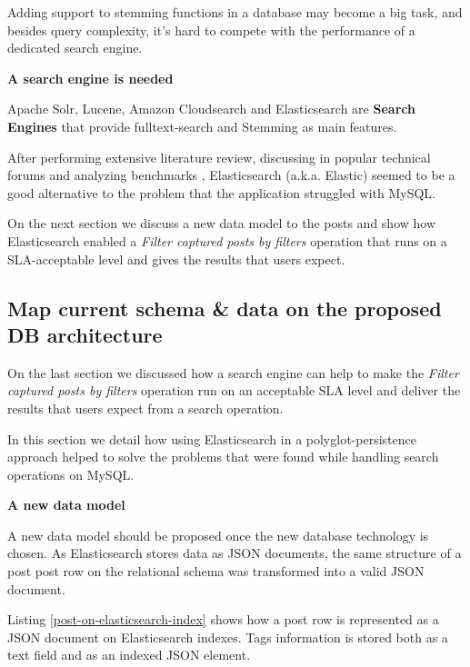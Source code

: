 Adding support to stemming functions in a database may become a big task, and besides query complexity, it's hard to compete with the performance of a dedicated search engine.   

\noindent \textbf{A search engine is needed}

Apache Solr, Lucene, Amazon Cloudsearch and Elasticsearch are \textbf{Search Engines} that provide fulltext-search and Stemming as main features.

After performing extensive literature review, discussing in popular technical forums and analyzing benchmarks \cite{StackOverflowElastic} \cite{SolrVsES} \cite{quoraES}, Elasticsearch (a.k.a. Elastic) seemed to be a good alternative to the problem that the application struggled with MySQL.

On the next section we discuss a new data model to the posts and show how Elasticsearch enabled a \textit{Filter captured posts by filters} operation that runs on a SLA-acceptable level and gives the results that users expect. 

 










\subsection{Map current schema \& data on the proposed DB architecture}

On the last section we discussed how a search engine can help to make the \textit{Filter captured posts by filters} operation run on an acceptable SLA level and deliver the results that users expect from a search operation. 

In this section we detail how using Elasticsearch in a polyglot-persistence approach helped to solve the problems that were found while handling search operations on MySQL.

\noindent \textbf{A new data model}

A new data model should be proposed once the new database technology is chosen. As Elasticsearch stores data as JSON documents, the same structure of a post post row on the relational schema was transformed into a valid JSON document.

Listing \ref{post-on-elasticsearch-index} shows how a post row is represented as a JSON document on Elasticsearch indexes. Tags information is stored both as a text field and as an indexed JSON element.

